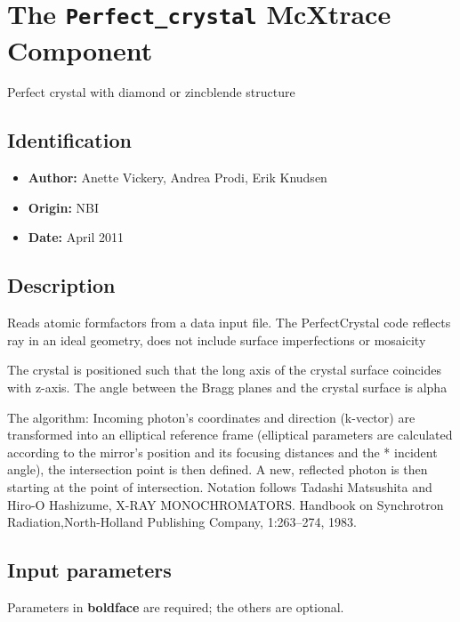 \section{The \texttt{Perfect\_crystal} McXtrace Component}
Perfect crystal with diamond or zincblende structure

\subsection*{Identification}
\begin{itemize}
  \item \textbf{Author:} Anette Vickery, Andrea Prodi, Erik Knudsen
  \item \textbf{Origin:} NBI
  \item \textbf{Date:} April 2011
\end{itemize}

\subsection*{Description}
Reads atomic formfactors from a data input file. The PerfectCrystal code reflects ray in an ideal geometry, does not include surface imperfections or mosaicity

The crystal is positioned such that the long axis of the crystal surface coincides with z-axis. The angle between the Bragg planes and the crystal surface is alpha

The algorithm: Incoming photon's coordinates and direction (k-vector) are transformed into an elliptical reference frame (elliptical parameters are calculated according to the mirror's position and its focusing distances and the * incident angle), the intersection point is then defined. A new, reflected photon is then starting at the point of intersection. Notation follows Tadashi Matsushita and Hiro-O Hashizume, X-RAY MONOCHROMATORS. Handbook on Synchrotron Radiation,North-Holland Publishing Company, 1:263–274, 1983.

\subsection*{Input parameters}
Parameters in \textbf{boldface} are required; the others are optional.

